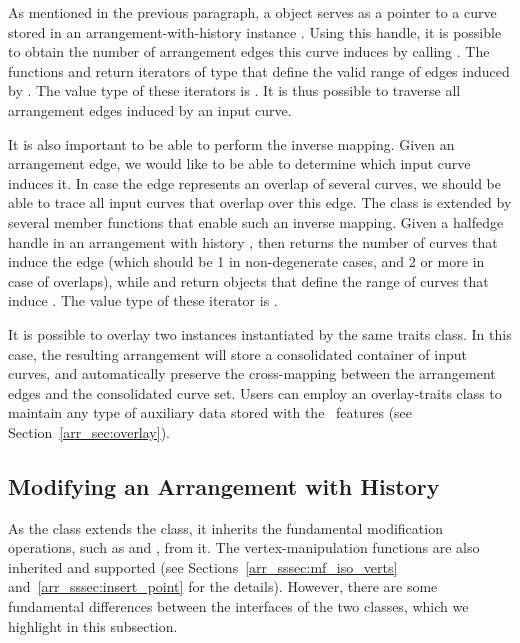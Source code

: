 As mentioned in the previous paragraph, a  object  
serves as a pointer to a curve stored in an arrangement-with-history instance 
. Using this handle, it is possible to obtain the number of 
arrangement edges this curve induces by calling 
. The functions 
 and
 return iterators of type
 that define the
valid range of edges induced by . The value type of these iterators
is . It is thus possible to traverse all arrangement
edges induced by an input curve.

It is also important to be able to perform the inverse mapping. Given an
arrangement edge, we would like to be able to determine which input curve
induces it. In case the edge represents an overlap of several curves, we
should be able to trace all input curves that overlap over this edge.
The  class is extended by several member
functions that enable such an inverse mapping. Given a halfedge handle 
in an arrangement with history , then 
 returns the number of curves that
induce the edge (which should be 1 in non-degenerate cases, and 2 or more
in case of overlaps), while  and 
 return 
 objects that
define the range of curves that induce . The value type of these
iterator is .

It is possible to overlay two  instances 
instantiated by the same traits class. In this case, the resulting 
arrangement will store a consolidated container of input curves, and 
automatically preserve the cross-mapping between the arrangement edges 
and the consolidated curve set. Users can employ an overlay-traits class
to maintain any type of auxiliary data stored with the \dcel\ features
(see Section~\ref{arr_sec:overlay}).

\subsection{Modifying an Arrangement with History\label{arr_ssec:modif_traverse}}

As the  class extends the 
class, it inherits the fundamental modification operations, such as 
 and , from it. The vertex-manipulation functions
are also inherited and supported (see Sections~\ref{arr_sssec:mf_iso_verts}
and~\ref{arr_sssec:insert_point} for the details). However, there are some 
fundamental differences between the interfaces of the two classes, which we
highlight in this subsection.

